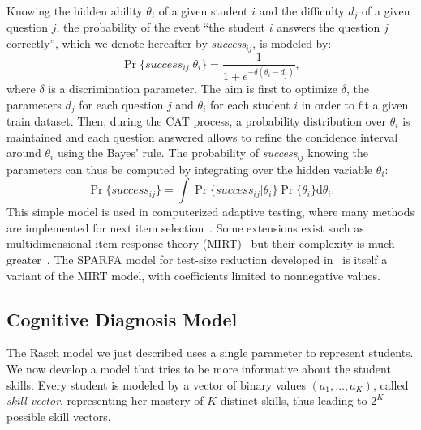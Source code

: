 \documentclass{edm_template}
\begin{document}
Knowing the hidden ability $\theta_i$ of a given student $i$ and the difficulty $d_j$ of a given question $j$, the probability of the event ``the student $i$ answers the question $j$ correctly'', which we denote hereafter by \emph{success}$_{ij}$, is modeled by:
\[ \Pr\{success_{ij}|\theta_i\} = \frac1{1+e^{-\delta(\theta_i - d_j)}}, \]
where $\delta$ is a discrimination parameter. The aim is first to optimize $\delta$, the parameters $d_j$ for each question $j$ and $\theta_i$ for each student $i$ in order to fit a given train dataset. Then, during the CAT process, a probability distribution over $\theta_i$ is maintained and each question answered allows to refine the confidence interval around $\theta_i$ using the Bayes' rule. The probability of \emph{success}$_{ij}$ knowing the parameters can thus be computed by integrating over the hidden variable $\theta_i$:
\[ \Pr\{success_{ij}\} = \int \Pr\{success_{ij}|\theta_i\} \Pr\{\theta_i\} \mathrm d\theta_i. \]
This simple model is used in computerized adaptive testing, where many methods are implemented for next item selection~\cite{MagisRaiche2012}. Some extensions exist such as multidimensional item response theory (MIRT)~\cite{Segall1996} but their complexity is much greater~\cite{Desmarais2012}. The SPARFA model for test-size reduction developed in~\cite{Vats2013} is itself a variant of the MIRT model, with coefficients limited to nonnegative values.

\subsection{Cognitive Diagnosis Model}

The Rasch model we just described uses a single parameter to represent students. We now develop a model that tries to be more informative about the student skills. Every student is modeled by a vector of binary values $(a_1, \ldots, a_K)$, called \emph{skill vector}, representing her mastery of $K$ distinct skills, thus leading to $2^K$ possible skill vectors. 
\end{document}
